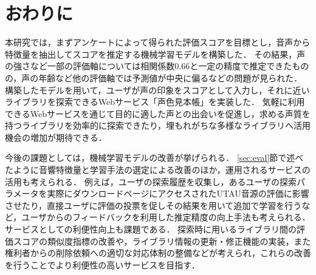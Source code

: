 \documentclass[a4j,8pt,twocolumn]{extarticle}
\begin{document}
\section{おわりに}
本研究では，まずアンケートによって得られた評価スコアを目標とし，音声から特徴量を抽出してスコアを推定する機械学習モデルを構築した．
その結果，声の強さなど一部の評価軸については相関係数0.66と一定の精度で推定できたものの，声の年齢など他の評価軸では予測値が中央に偏るなどの問題が見られた．
構築したモデルを用いて，ユーザが声の印象をスコアとして入力し，それに近いライブラリを探索できるWebサービス「声色見本帳」を実装した．
気軽に利用できるWebサービスを通じて目的に適した声との出会いを促進し，求める声質を持つライブラリを効率的に探索できたり，埋もれがちな多様なライブラリへ活用機会の増加が期待できる．

今後の課題としては，機械学習モデルの改善が挙げられる．
\ref{sec:eval}節で述べたように音響特徴量と学習手法の選定による改善のほか，運用されるサービスの活用も考えられる．
例えば，ユーザの探索履歴を収集し，あるユーザの探索パラメータを実際にダウンロードページにアクセスされたUTAU音源の評価に影響させたり，直接ユーザに評価の投票を促しその結果を用いて追加で学習を行うなど，ユーザからのフィードバックを利用した推定精度の向上手法も考えられる．
サービスとしての利便性向上も課題である．
探索時に用いるライブラリ間の評価スコアの類似度指標の改善や，ライブラリ情報の更新・修正機能の実装，また権利者からの削除依頼への適切な対応体制の整備などが考えられ，これらの改善を行うことでより利便性の高いサービスを目指す．
\end{document}
